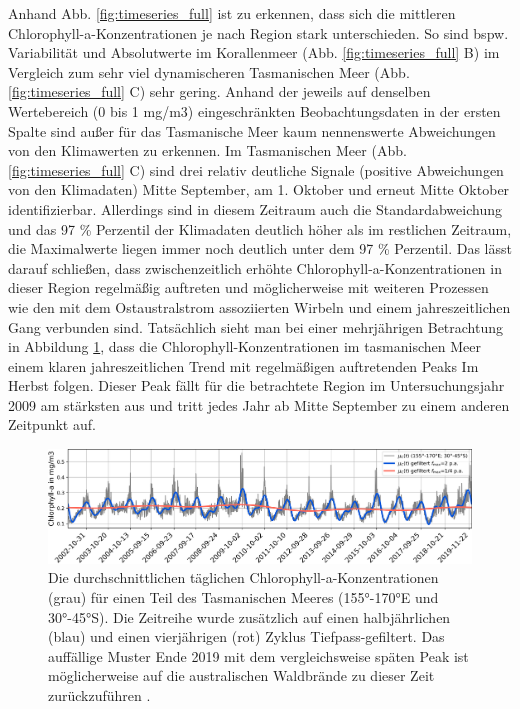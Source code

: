 \documentclass[12pt,a4paper,onecolumn,headheight=30pt]{scrartcl}
\begin{document}
Anhand Abb. \ref{fig:timeseries_full} ist zu erkennen, dass sich die mittleren Chlorophyll-a-Konzentrationen je nach Region stark unterschieden. So sind bspw. Variabilität und Absolutwerte im Korallenmeer (Abb. \ref{fig:timeseries_full} B) im Vergleich zum sehr viel dynamischeren Tasmanischen Meer (Abb. \ref{fig:timeseries_full} C) sehr gering. Anhand der jeweils auf denselben Wertebereich (0 bis 1 mg/m3) eingeschränkten Beobachtungsdaten in der ersten Spalte sind außer für das Tasmanische Meer kaum nennenswerte Abweichungen von den Klimawerten zu erkennen. Im Tasmanischen Meer (Abb. \ref{fig:timeseries_full} C) sind drei relativ deutliche Signale (positive Abweichungen von den Klimadaten) Mitte September, am 1. Oktober und erneut Mitte Oktober identifizierbar. Allerdings sind in diesem Zeitraum auch die Standardabweichung und das 97 \% Perzentil der Klimadaten deutlich höher als im restlichen Zeitraum, die Maximalwerte liegen immer noch deutlich unter dem 97 \% Perzentil. Das lässt darauf schließen, dass zwischenzeitlich erhöhte Chlorophyll-a-Konzentrationen in dieser Region regelmäßig auftreten und möglicherweise mit weiteren Prozessen wie den mit dem Ostaustralstrom assoziierten Wirbeln und einem jahreszeitlichen Gang \citep{Tilburg.2002} verbunden sind. Tatsächlich sieht man bei einer mehrjährigen Betrachtung in Abbildung \ref{fig:long_timeseries_tasman}, dass die Chlorophyll-Konzentrationen im tasmanischen Meer einem klaren jahreszeitlichen Trend mit regelmäßigen auftretenden Peaks Im Herbst folgen. Dieser Peak fällt für die betrachtete Region im Untersuchungsjahr 2009 am stärksten aus und tritt jedes Jahr ab Mitte September zu einem anderen Zeitpunkt auf.
\begin{figure}[htbp]
\includegraphics[width=\textwidth]{bilder/long_timeseries_tasman.png}
\caption{Die durchschnittlichen täglichen Chlorophyll-a-Konzentrationen (grau) für einen Teil des Tasmanischen Meeres (155°-170°E und 30°-45°S). Die Zeitreihe wurde zusätzlich auf einen halbjährlichen (blau) und einen vierjährigen (rot) Zyklus Tiefpass-gefiltert. Das auffällige Muster Ende 2019 mit dem vergleichsweise späten Peak ist möglicherweise auf die australischen Waldbrände zu dieser Zeit zurückzuführen \citep{Li.2021}.} \label{fig:long_timeseries_tasman}
\end{figure}
\end{document}

